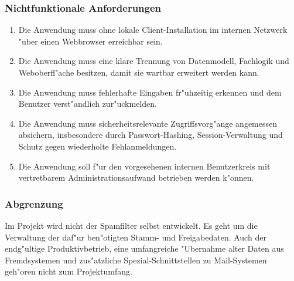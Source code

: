 \subsubsection*{Nichtfunktionale Anforderungen}
\begin{enumerate}
\item Die Anwendung muss ohne lokale Client-Installation im internen Netzwerk
      "uber einen Webbrowser erreichbar sein.
\item Die Anwendung muss eine klare Trennung von Datenmodell, Fachlogik und
      Weboberfl"ache besitzen, damit sie wartbar erweitert werden kann.
\item Die Anwendung muss fehlerhafte Eingaben fr"uhzeitig erkennen und dem
      Benutzer verst"andlich zur"uckmelden.
\item Die Anwendung muss sicherheitsrelevante Zugriffsvorg"ange angemessen
      absichern, insbesondere durch Passwort-Hashing, Session-Verwaltung und
      Schutz gegen wiederholte Fehlanmeldungen.
\item Die Anwendung soll f"ur den vorgesehenen internen Benutzerkreis mit
      vertretbarem Administrationsaufwand betrieben werden k"onnen.
\end{enumerate}

\subsubsection*{Abgrenzung}
Im Projekt wird nicht der Spamfilter selbst entwickelt. Es geht um die
Verwaltung der daf"ur ben"otigten Stamm- und Freigabedaten. Auch der endg"ultige
Produktivbetrieb, eine umfangreiche "Ubernahme alter Daten aus Fremdsystemen
und zus"atzliche Spezial-Schnittstellen zu Mail-Systemen geh"oren nicht zum
Projektumfang.
